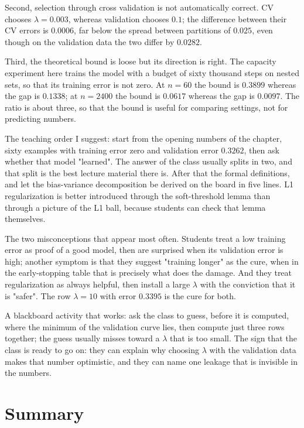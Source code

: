 Second, selection through cross validation is not automatically correct. CV chooses
$\lambda=0.003$, whereas validation chooses $0.1$; the difference between their CV errors
is $0.0006$, far below the spread between partitions of $0.025$, even though on the
validation data the two differ by $0.0282$.

Third, the theoretical bound is loose but its direction is right. The capacity
experiment here trains the model with a budget of sixty thousand steps on nested sets,
so that its training error is not zero. At $n=60$ the bound is $0.3899$ whereas the gap
is $0.1338$; at $n=2400$ the bound is $0.0617$ whereas the gap is $0.0097$. The ratio is
about three, so that the bound is useful for comparing settings, not for predicting
numbers.

\begin{untukdosen}
The teaching order I suggest: start from the opening numbers of the chapter, sixty
examples with training error zero and validation error $0.3262$, then ask whether that
model "learned". The answer of the class usually splits in two, and that split is the
best lecture material there is. After that the formal definitions, and let the
bias-variance decomposition be derived on the board in five lines. L1 regularization is
better introduced through the soft-threshold lemma than through a picture of the L1
ball, because students can check that lemma themselves.

The two misconceptions that appear most often. Students treat a low training error as
proof of a good model, then are surprised when its validation error is high; another
symptom is that they suggest "training longer" as the cure, when in the early-stopping
table that is precisely what does the damage. And they treat regularization as always
helpful, then install a large $\lambda$ with the conviction that it is "safer". The row
$\lambda=10$ with error $0.3395$ is the cure for both.

A blackboard activity that works: ask the class to guess, before it is computed, where
the minimum of the validation curve lies, then compute just three rows together; the
guess usually misses toward a $\lambda$ that is too small. The sign that the class is
ready to go on: they can explain why choosing $\lambda$ with the validation data makes
that number optimistic, and they can name one leakage that is invisible in the numbers.
\end{untukdosen}

\section{Summary}

